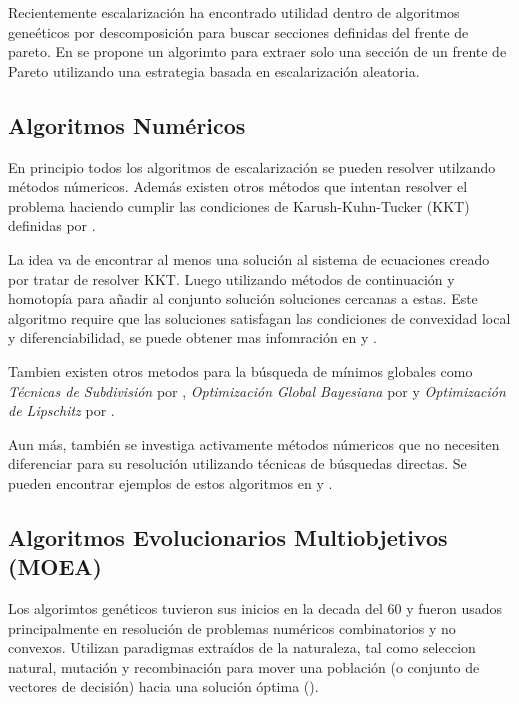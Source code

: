 Recientemente escalarizaci\'on ha encontrado utilidad dentro de algoritmos gene\'eticos por descomposici\'on para buscar secciones definidas del frente de pareto.  En \cite{paria2020flexible} se propone un algorimto para extraer solo una secci\'on de un frente de Pareto utilizando una estrategia basada en escalarizaci\'on aleatoria.


\subsection{Algoritmos Num\'ericos}

En principio todos los algoritmos de escalarizaci\'on se pueden resolver utilzando m\'etodos n\'umericos. Adem\'as existen otros m\'etodos  que intentan resolver el problema haciendo cumplir las condiciones de Karush-Kuhn-Tucker (KKT) definidas por \cite{kuhn2014nonlinear}.

La idea va de encontrar al menos una soluci\'on al sistema de ecuaciones creado por tratar de resolver KKT. Luego utilizando m\'etodos de continuaci\'on y homotop\'ia para añadir al conjunto soluci\'on soluciones cercanas a estas. Este algoritmo require que las soluciones satisfagan las condiciones de convexidad local y diferenciabilidad, se puede obtener mas infomraci\'on en \cite{hillermeier2001nonlinear} y \cite{schutze_et_al:DagSemProc.04461.16}.

Tambien existen otros metodos para la b\'usqueda de m\'inimos globales como \textit{T\'ecnicas de Subdivisi\'on} por \cite{dellnitz2005covering}, \textit{Optimizaci\'on Global Bayesiana} por \cite{emmerich2016multicriteria} y \textit{Optimizaci\'on de Lipschitz} por \cite{vzilinskas2013worst}. %

Aun m\'as, tambi\'en se investiga activamente m\'etodos n\'umericos que no necesiten diferenciar para su resoluci\'on utilizando t\'ecnicas de b\'usquedas directas. Se pueden encontrar ejemplos de estos algoritmos en \cite{custodio2011direct} y \cite{audet2010mesh}.

\subsection{Algoritmos Evolucionarios Multiobjetivos (MOEA)}

Los algorimtos gen\'eticos tuvieron sus inicios en la decada del 60 y fueron usados principalmente en resoluci\'on de problemas num\'ericos combinatorios y no convexos. Utilizan paradigmas extra\'idos de la naturaleza, tal como seleccion natural, mutaci\'on y recombinaci\'on para mover una poblaci\'on (o conjunto de vectores de decisi\'on) hacia una soluci\'on \'optima (\cite{back1996evolutionary}).

